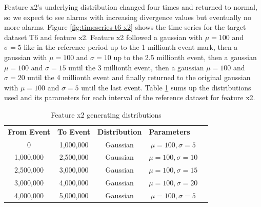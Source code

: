 Feature x2's underlying distribution changed four times and returned to normal, so we expect to see alarms with increasing divergence values but eventually no more alarms. Figure \ref{fig:timeseries-t6-x2} shows the time-series for the target dataset T6 and feature x2. Feature x2 followed a gaussian with $\mu=100$ and $\sigma=5$ like in the reference period up to the 1 millionth event mark, then a gaussian with $\mu=100$ and $\sigma=10$ up to the 2.5 millionth event, then a gaussian $\mu=100$ and $\sigma=15$ until the 3 millionth event, then a gaussian $\mu=100$ and $\sigma=20$ until the 4 millionth event and finally returned to the original gaussian with $\mu=100$ and $\sigma=5$ until the last event. Table \ref{tbl:multi-feat-x2-changes} sums up the distributions used and its parameters for each interval of the reference dataset for feature x2.
\begin{table}[!htb]
    \begin{center}
    \begin{tabular}{|c|c|c|c|l}
    \cline{1-4}
    \textbf{From Event} & \textbf{To Event} & \textbf{Distribution} & \multicolumn{1}{l|}{\textbf{Parameters}} &  \\ \cline{1-4}
    0                   & 1,000,000         & Gaussian              & $\mu=100, \sigma=5$                      &  \\ \cline{1-4}
    1,000,000           & 2,500,000         & Gaussian              & $\mu=100, \sigma=10$                     &  \\ \cline{1-4}
    2,500,000           & 3,000,000         & Gaussian              & $\mu=100, \sigma=15$                     &  \\ \cline{1-4}
    3,000,000           & 4,000,000         & Gaussian              & $\mu=100, \sigma=20$                      &  \\ \cline{1-4}
    4,000,000           & 5,000,000         & Gaussian              & $\mu=100, \sigma=5$                      &  \\ \cline{1-4}
    \end{tabular}
    \end{center}
    \caption{Feature x2 generating distributions}
    \label{tbl:multi-feat-x2-changes}
\end{table}

